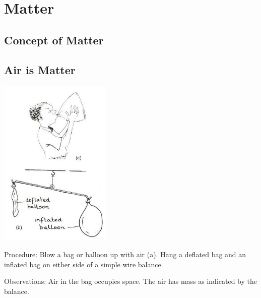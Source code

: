 \section{Matter} 

\begin{multicols}{2}


\section*{Concept of Matter}


\subsection{Air is Matter} 

\begin{center}
\includegraphics[width=0.4\textwidth]{./img/source/air-matter.jpg}
\end{center}

\begin{description*}
\item[Procedure:]{Blow a bag or balloon up with air (a). Hang a deflated bag and an inflated bag on either side of a simple wire balance.}
\item[Observations:]{Air in the bag occupies space. The air has mass as indicated by the balance.}
\end{description*}


\end{multicols}
